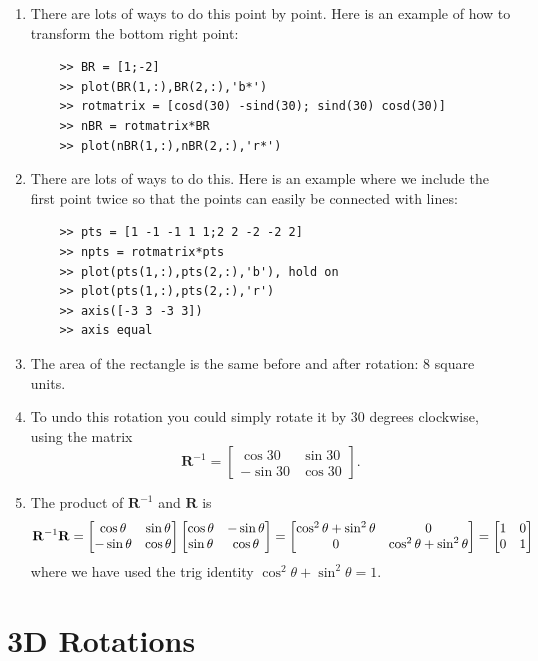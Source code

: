 \begin{sol}
\begin{enumerate}
    \item There are lots of ways to do this point by point. Here is an example of how to transform the bottom right point:
    \begin{verbatim}
    >> BR = [1;-2]
    >> plot(BR(1,:),BR(2,:),'b*')
    >> rotmatrix = [cosd(30) -sind(30); sind(30) cosd(30)]
    >> nBR = rotmatrix*BR
    >> plot(nBR(1,:),nBR(2,:),'r*')
    \end{verbatim}
    
    \item There are lots of ways to do this. Here is an example where we include the first point twice so that the points can easily be connected with lines:
    \begin{verbatim}
    >> pts = [1 -1 -1 1 1;2 2 -2 -2 2]
    >> npts = rotmatrix*pts
    >> plot(pts(1,:),pts(2,:),'b'), hold on
    >> plot(pts(1,:),pts(2,:),'r')
    >> axis([-3 3 -3 3])
    >> axis equal
    \end{verbatim}
    
    \item The area of the rectangle is the same before and after rotation: 8 square units.
    
    \item To undo this rotation you could simply rotate it by 30 degrees clockwise, using the matrix
    $$\mathbf{R}^{-1} = \begin{bmatrix}
    \cos 30 & \sin 30 \\ -\sin 30 & \cos 30
    \end{bmatrix}.$$
    
    \item The product of $\mathbf{R}^{-1}$ and $\mathbf{R}$ is
    $$\mathbf{R}^{-1} \mathbf{R} = \begin{bmatrix} \cos \theta & \sin \theta \\ -\sin \theta & \cos \theta\end{bmatrix} \begin{bmatrix} \cos \theta & -\sin \theta \\ \sin \theta & \cos \theta\end{bmatrix} = \begin{bmatrix} \cos^2 \theta + \sin^2 \theta & 0 \\ 0 & \cos^2 \theta + \sin^2 \theta\end{bmatrix} = \begin{bmatrix} 1 & 0 \\ 0 & 1\end{bmatrix}$$
    where we have used the trig identity $\cos^2 \theta + \sin^2 \theta = 1$.

\end{enumerate}
\end{sol}

\section{3D Rotations}

